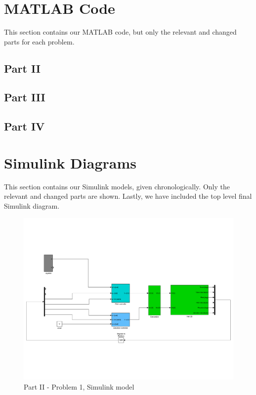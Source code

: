 \appendix

\section{MATLAB Code}\label{sec:matlab}
This section contains our MATLAB code, but only the relevant and changed parts for each problem. 

\subsection{Part II}\label{subsec:P2_init.m}


\subsection{Part III}\label{subsec:P3_init.m}


\subsection{Part IV}\label{subsec:P4p2_init.m}


\section{Simulink Diagrams}\label{sec:simulink}
This section contains our Simulink models, given chronologically. Only the relevant and changed parts are shown. Lastly, we have included the top level final Simulink diagram.
\begin{figure}[htb]
	\centering
		\includegraphics[width=\textwidth]{models/P2p1.pdf}
	\caption{Part II - Problem 1, Simulink model}
\label{fig:P2p1}
\end{figure}

